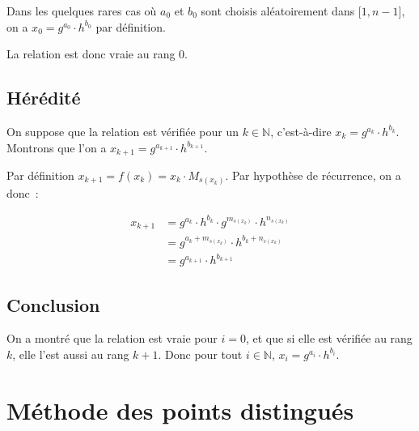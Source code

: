         Dans les quelques rares cas où $a_0$ et $b_0$ sont choisis aléatoirement dans $\mathopen{[}1,n-1\mathclose{]}$, on a $x_0 = g^{a_0} \cdot h^{b_0}$ par définition.
        
        La relation est donc vraie au rang $0$.
        
        \subsection*{Hérédité}
        On suppose que la relation est vérifiée pour un $k \in \mathbb{N}$, c'est-à-dire $x_k = g^{a_k} \cdot h^{b_k}$. Montrons que l'on a $x_{k+1} = g^{a_{k+1}} \cdot h^{b_{k+1}}$.
        
        Par définition $x_{k+1} = f(x_k) = x_k \cdot M_{s(x_k)}$. Par hypothèse de récurrence, on a donc~:
       
       \begin{align*}
          x_{k+1} &= g^{a_k} \cdot h^{b_k} \cdot g^{m_{s(x_k)}} \cdot h^{n_{s(x_k)}} \\
                  &= g^{a_k + m_{s(x_k)}} \cdot h^{b_k + n_{s(x_k)}} \\
                  &=g^{a_{k+1}} \cdot h^{b_{k+1}}
        \end{align*}
        
        \subsection*{Conclusion}
        On a montré que la relation est vraie pour $i = 0$, et que si elle est vérifiée au rang $k$, elle l'est aussi au rang $k + 1$. Donc pour tout $i \in \mathbb{N}$, $x_i = g^{a_i} \cdot h^{b_i}$.
        
        \section{Méthode des points distingués}
        